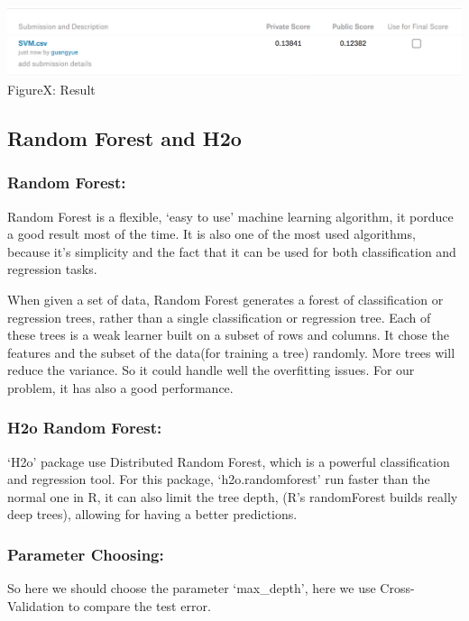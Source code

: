 \documentclass[12pt]{article}
\begin{document}
	\begin{center}
	\includegraphics[width=9in]{image/svmres.png}\\
	FigureX: Result
	\end{center}

\subsection{Random Forest and H2o}

	\subsubsection{Random Forest:}
	
	Random Forest is a flexible, `easy to use' machine learning algorithm, it porduce a good result most of the time. It is also one of the most used algorithms, because it's simplicity and the fact that it can be used for both classification and regression tasks.

	When given a set of data, Random Forest generates a forest of classification or regression trees, rather than a single classification or regression tree. Each of these trees is a weak learner built on a subset of rows and columns. It chose the features and the subset of the data(for training a tree) randomly. More trees will reduce the variance. So it could handle well the overfitting issues. For our problem, it has also a good performance.

	\subsubsection{H2o Random Forest:}

	`H2o' package use Distributed Random Forest, which is a powerful classification and regression tool. For this package, `h2o.randomforest' run faster than the normal one in R, it can also limit the tree depth, (R's randomForest builds really deep trees), allowing for having a better predictions.

	\subsubsection{Parameter Choosing:}

	So here we should choose the parameter `max\_depth', here we use Cross-Validation to compare the test error.
\end{document}
